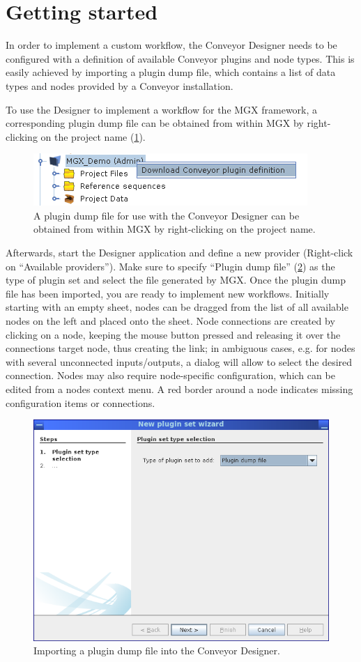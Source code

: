 \section{Getting started}

In order to implement a custom workflow, the Conveyor Designer needs to be configured
with a definition of available Conveyor plugins and node types. This is easily 
achieved by importing a plugin dump file, which contains a list of data types and
nodes provided by a Conveyor installation.

To use the Designer to implement a workflow for the MGX framework, a corresponding
plugin dump file can be obtained from within MGX by right-clicking on the 
project name (\ref{getdump}).

\begin{figure}[H]
\centering
\includegraphics[width=.5\textwidth]{img/conveyor/getdump}
\caption[Plugin dump.]{A plugin dump file for use with the Conveyor Designer can be obtained from within MGX
by right-clicking on the project name.}
\label{getdump}
\end{figure}

Afterwards, start the Designer application and define a new provider (Right-click on ``Available providers''). 
Make sure to specify ``Plugin dump file'' (\ref{loaddump}) as the type of plugin set and select the file
generated by MGX. Once the plugin
dump file has been imported, you are ready to implement new workflows. Initially starting with an empty sheet,
nodes can be dragged from the list of all available nodes on the left and placed onto the sheet. Node connections
are created by clicking on a node, keeping the mouse button pressed and releasing it over the connections target
node, thus creating the link; in ambiguous cases, e.g. for nodes with several unconnected
inputs/outputs, a dialog will allow to select the desired connection.
Nodes may also require node-specific configuration, which can be edited from a nodes context menu.
A red border around a node indicates missing configuration items or connections.

\begin{figure}[H]
\centering
\includegraphics[width=.7\textwidth]{img/conveyor/loaddump}
\caption[Adding a new provider.]{Importing a plugin dump file into the Conveyor Designer.}
\label{loaddump}
\end{figure}

